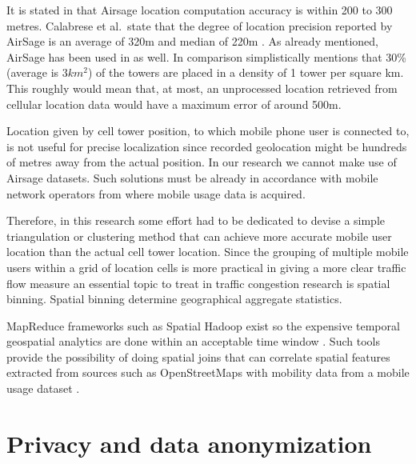 \documentclass[12pt, a4paper]{report}
\theoremstyle{definition}
\theoremstyle{definition}%
\theoremstyle{definition}%
\theoremstyle{definition}%
\theoremstyle{definition}%
\theoremstyle{definition}%
\begin{document}
It is stated in \cite{Colak2015} that Airsage location computation accuracy is within 200 to 300 metres. Calabrese et al.\ state that the degree of location precision reported by AirSage is an average of 320m and median of 220m \cite{Calabrese2013}. As already mentioned, AirSage has been used in \cite{Hoteit2014} as well. In comparison \cite{Gonzalez2008} simplistically mentions that 30\% (average is \(3km^{2}\)) of the towers are placed in a density of 1 tower per square km. This roughly would mean that, at most, an unprocessed location retrieved from cellular location data would have a maximum error of around 500m. 

Location given by cell tower position, to which mobile phone user is connected to, is not useful for precise localization since recorded geolocation might be hundreds of metres away from the actual position. In our research we cannot make use of Airsage datasets. Such solutions must be already in accordance with mobile network operators from where mobile usage data is acquired.

Therefore, in this research some effort had to be dedicated to devise a simple triangulation or clustering method that can achieve more accurate mobile user location than the actual cell tower location. Since the grouping of multiple mobile users within a grid of location cells is more practical in giving a more clear traffic flow measure an essential topic to treat in traffic congestion research is spatial binning. Spatial binning determine geographical aggregate statistics. 

MapReduce frameworks such as Spatial Hadoop exist so the expensive temporal geospatial analytics are done within an acceptable time window \cite{Wu2014,eldawy2015spatialhadoop}. Such tools provide the possibility of doing spatial joins that can correlate spatial features extracted from sources such as OpenStreetMaps with mobility data from a mobile usage dataset \cite{Alarabi2014}.


\section{Privacy and data anonymization} \label{data_anonymization} 
\end{document}
